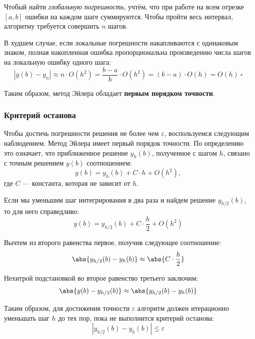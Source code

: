 Чтобый найти \textit{глобальную погрешность}, учтём, что при работе на всем отрезке $[a, b]$ ошибки на каждом шаге суммируются. Чтобы пройти весь интервал, алгоритму требуется совершить $n$ шагов.

В худшем случае, если локальные погрешности накапливаются с одинаковым знаком, полная накопленная ошибка пропорциональна произведению числа шагов на локальную ошибку одного шага:
\[
|y(b) - y_n| \approx n \cdot O(h^2) = \frac{b - a}{h} \cdot O(h^2) = (b - a) \cdot O(h) = O(h)\ \square
\]

Таким образом, метод Эйлера обладает \textbf{первым порядком точности}.

\subsubsection{Критерий останова}

Чтобы достичь погрешности решения не более чем \( \varepsilon \), воспользуемся следующим наблюдением\cite{wikipedia_runge_rule}. Метод Эйлера имеет первый порядок точности. По определению это означает, что приближенное решение $y_h(b)$, полученное с шагом $h$, связано с точным решением $y(b)$ соотношением:
\[
y(b) = y_h(b) + C \cdot h + O(h^2),
\]
где $C$ --- константа, которая не зависит от $h$.

Если мы уменьшим шаг интегрирования в два раза и найдем решение $y_{h/2}(b)$, то для него справедливо:
\[
y(b) = y_{h/2}(b) + C \cdot \frac{h}{2} + O(h^2)
\]

Вычтем из второго равенства первое, получив следующее соотношение:
\[
\abs{y_{h/2}(b) - y_h(b)} \approx \abs{C \cdot \frac{h}{2}}
\]

Нехитрой подстановкой во второе равенство третьего заключим:
\[
  \abs{y(b) - y_{h/2}(b)} \approx \abs{y_{h/2}(b) - y_h(b)}
\]

Таким образом, для достижения точности $\varepsilon$ алгоритм должен итерационно уменьшать шаг $h$ до тех пор, пока не выполнится критерий останова:
\[
|y_{h/2}(b) - y_h(b)| \le \varepsilon
\]